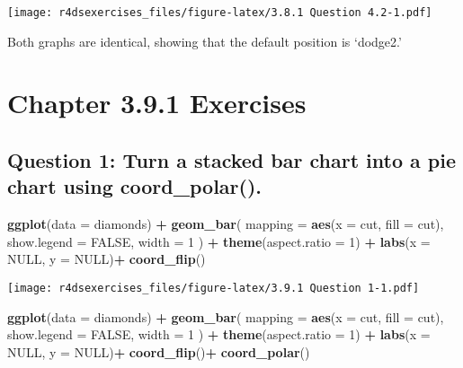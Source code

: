 \documentclass[
]{book}
\newenvironment{Shaded}{\begin{snugshade}}{\end{snugshade}}
\newcommand{\DataTypeTok}[1]{\textcolor[rgb]{0.13,0.29,0.53}{#1}}
\newcommand{\DecValTok}[1]{\textcolor[rgb]{0.00,0.00,0.81}{#1}}
\newcommand{\KeywordTok}[1]{\textcolor[rgb]{0.13,0.29,0.53}{\textbf{#1}}}
\newcommand{\NormalTok}[1]{#1}
\newcommand{\OperatorTok}[1]{\textcolor[rgb]{0.81,0.36,0.00}{\textbf{#1}}}
\newcommand{\OtherTok}[1]{\textcolor[rgb]{0.56,0.35,0.01}{#1}}
\newcommand{\StringTok}[1]{\textcolor[rgb]{0.31,0.60,0.02}{#1}}
\begin{document}
\texttt{[image: r4dsexercises\_files/figure-latex/3.8.1 Question 4.2-1.pdf]}

Both graphs are identical, showing that the default position is `dodge2.'

\hypertarget{chapter-3.9.1-exercises}{%
\section{Chapter 3.9.1 Exercises}\label{chapter-3.9.1-exercises}}

\hypertarget{question-1-turn-a-stacked-bar-chart-into-a-pie-chart-using-coord_polar.}{%
\subsection{Question 1: Turn a stacked bar chart into a pie chart using coord\_polar().}\label{question-1-turn-a-stacked-bar-chart-into-a-pie-chart-using-coord_polar.}}

\begin{Shaded}
\begin{Highlighting}[]
\KeywordTok{ggplot}\NormalTok{(}\DataTypeTok{data =}\NormalTok{ diamonds) }\OperatorTok{+}\StringTok{ }
\StringTok{  }\KeywordTok{geom_bar}\NormalTok{(}
    \DataTypeTok{mapping =} \KeywordTok{aes}\NormalTok{(}\DataTypeTok{x =}\NormalTok{ cut, }\DataTypeTok{fill =}\NormalTok{ cut), }
    \DataTypeTok{show.legend =} \OtherTok{FALSE}\NormalTok{,}
    \DataTypeTok{width =} \DecValTok{1}
\NormalTok{  ) }\OperatorTok{+}\StringTok{ }
\StringTok{  }\KeywordTok{theme}\NormalTok{(}\DataTypeTok{aspect.ratio =} \DecValTok{1}\NormalTok{) }\OperatorTok{+}
\StringTok{  }\KeywordTok{labs}\NormalTok{(}\DataTypeTok{x =} \OtherTok{NULL}\NormalTok{, }\DataTypeTok{y =} \OtherTok{NULL}\NormalTok{)}\OperatorTok{+}
\StringTok{  }\KeywordTok{coord_flip}\NormalTok{()}
\end{Highlighting}
\end{Shaded}

\texttt{[image: r4dsexercises\_files/figure-latex/3.9.1 Question 1-1.pdf]}

\begin{Shaded}
\begin{Highlighting}[]
\KeywordTok{ggplot}\NormalTok{(}\DataTypeTok{data =}\NormalTok{ diamonds) }\OperatorTok{+}\StringTok{ }
\StringTok{  }\KeywordTok{geom_bar}\NormalTok{(}
    \DataTypeTok{mapping =} \KeywordTok{aes}\NormalTok{(}\DataTypeTok{x =}\NormalTok{ cut, }\DataTypeTok{fill =}\NormalTok{ cut), }
    \DataTypeTok{show.legend =} \OtherTok{FALSE}\NormalTok{,}
    \DataTypeTok{width =} \DecValTok{1}
\NormalTok{  ) }\OperatorTok{+}\StringTok{ }
\StringTok{  }\KeywordTok{theme}\NormalTok{(}\DataTypeTok{aspect.ratio =} \DecValTok{1}\NormalTok{) }\OperatorTok{+}
\StringTok{  }\KeywordTok{labs}\NormalTok{(}\DataTypeTok{x =} \OtherTok{NULL}\NormalTok{, }\DataTypeTok{y =} \OtherTok{NULL}\NormalTok{)}\OperatorTok{+}
\StringTok{  }\KeywordTok{coord_flip}\NormalTok{()}\OperatorTok{+}
\StringTok{  }\KeywordTok{coord_polar}\NormalTok{()}
\end{Highlighting}
\end{Shaded}
\end{document}
